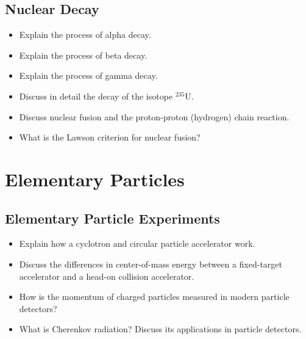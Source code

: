 \subsection{Nuclear Decay}
\begin{itemize}

    \item Explain the process of alpha decay.
	
	\item Explain the process of beta decay.
	
	\item Explain the process of gamma decay.
	
	\item Discuss in detail the decay of the isotope ${}^{235}\mathrm{U}$.
	
	\item Discuss nuclear fusion and the proton-proton (hydrogen) chain reaction.
	
	\item What is the Lawson criterion for nuclear fusion?
\end{itemize}

\section{Elementary Particles}

\subsection{Elementary Particle Experiments}
\begin{itemize}
	\item Explain how a cyclotron and circular particle accelerator work.
	
	\item Discuss the differences in center-of-mass energy between a fixed-target accelerator and a head-on collision accelerator.
	
	\item How is the momentum of charged particles measured in modern particle detectors?
	
	\item What is Cherenkov radiation?
    Discuss its applications in particle detectors.
\end{itemize}

